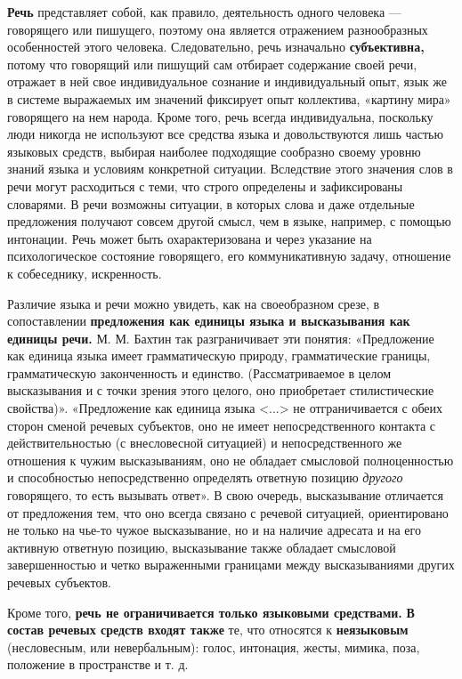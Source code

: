 \textbf{Речь} представляет собой, как правило, деятельность одного человека — говорящего или пишущего, поэтому она является отражением разнообразных особенностей этого человека.
Следовательно, речь изначально \textbf{субъективна,} потому что говорящий или пишущий сам отбирает содержание своей речи, отражает в ней свое индивидуальное сознание и индивидуальный опыт, язык же в системе выражаемых им значений фиксирует опыт коллектива, «картину мира» говорящего на нем народа.
Кроме того, речь всегда индивидуальна, поскольку люди никогда не используют все средства языка и довольствуются лишь частью языковых средств, выбирая наиболее подходящие сообразно своему уровню знаний языка и условиям конкретной ситуации.
Вследствие этого значения слов в речи могут расходиться с теми, что строго определены и зафиксированы словарями.
В речи возможны ситуации, в которых слова и даже отдельные предложения получают совсем другой смысл, чем в языке, например, с помощью интонации.
Речь может быть охарактеризована и через указание на психологическое состояние говорящего, его коммуникативную задачу, отношение к собеседнику, искренность.

Различие языка и речи можно увидеть, как на своеобразном срезе, в сопоставлении \textbf{предложения как единицы языка и высказывания как единицы речи.}
М. М. Бахтин так разграничивает эти понятия: «Предложение как единица языка имеет грамматическую природу, грамматические границы, грамматическую законченность и единство.
(Рассматриваемое в целом высказывания и с точки зрения этого целого, оно приобретает стилистические свойства)».
«Предложение как единица языка <...> не отграничивается с обеих сторон сменой речевых субъектов, оно не имеет непосредственного контакта с действительностью (с внесловесной ситуацией) и непосредственного же отношения к чужим высказываниям, оно не обладает смысловой полноценностью и способностью непосредственно определять ответную позицию \textit{другого} говорящего, то есть вызывать ответ».
В свою очередь, высказывание отличается от предложения тем, что оно всегда связано с речевой ситуацией, ориентировано не только на чье-то чужое высказывание, но и на наличие адресата и на его активную ответную позицию, высказывание также обладает смысловой завершенностью и четко выраженными границами между высказываниями других речевых субъектов.

Кроме того, \textbf{речь не ограничивается только языковыми средствами.}
\textbf{В состав речевых средств входят также} те, что относятся
к \textbf{неязыковым} (несловесным, или невербальным): голос, интонация, жесты, мимика, поза, положение в пространстве и т. д.

